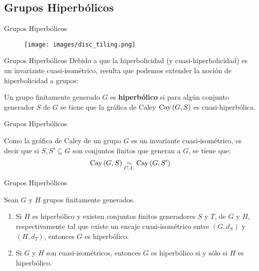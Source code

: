 \documentclass[xcolor=dvipsnames]{beamer}
\theoremstyle{largebreak}
\newcommand{\Cay}[1]{\ensuremath{\textup{Cay}\left(#1\right)}}
\newcommand{\qisom}{\ensuremath{\underset{C.I.}{\sim}}}
\begin{document}
\subsection{Grupos Hiperbólicos}

\begin{frame}
    \begin{center}
        \Large Grupos Hiperbólicos
    \end{center}
    \begin{figure}
        \begin{center}
            \texttt{[image: images/disc\_tiling.png]}
        \end{center}
    \end{figure}
\end{frame}

\begin{frame}{Grupos Hiperbólicos}
    Debido a que la hiperbolicidad (y cuasi-hiperbolicidad) es un invariante cuasi-isométrico, resulta que podemos extender la noción de hiperbolicidad a grupos:

    \begin{mydef}
        Un grupo finitamente generado $G$ es \textbf{hiperbólico} si para algún conjunto generador $S$ de $G$ se tiene que la gráfica de Caley $\Cay{G,S}$ es cuasi-hiperbólica.
    \end{mydef}
\end{frame}

\begin{frame}{Grupos Hiperbólicos}
    \begin{obs}
        Como la gráfica de Caley de un grupo $G$ es un invariante cuasi-isométrico, es decir que si $S,S'\subseteq G$ son conjuntos finitos que generan a $G$, se tiene que:
        \begin{equation*}
            \Cay{G,S}\qisom\Cay{G,S'}
        \end{equation*}
    \end{obs}
\end{frame}

\begin{frame}{Grupos Hiperbólicos}
    \begin{propo}
        Sean $G$ y $H$ grupos finitamente generados.
        \begin{enumerate}[label = \textit{(\arabic*)}]
            \item Si $H$ es hiperbólico y existen conjuntos finitos generadores $S$ y $T$, de $G$ y $H$, respectivamente tal que existe un encaje cuasi-isométrico entre $(G,d_S)$ y $(H,d_T)$, entonces $G$ es hiperbólico.
            \item Si $G$ y $H$ son cuasi-isométricos, entonces $G$ es hiperbólico si y sólo si $H$ es hiperbólico.
        \end{enumerate}
    \end{propo}
\end{frame}
\end{document}
